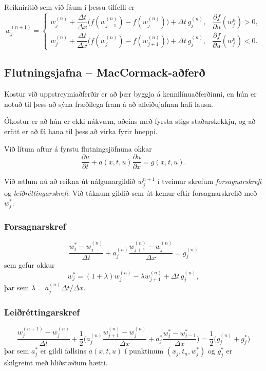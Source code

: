 \documentclass[icelandic,a4paper,12pt]{article}
\begin{document}
Reikniritið sem við fáum í þessu tilfelli er
$$
w_j^{(n+1)}=
\begin{cases} 
w_j^{(n)}+\dfrac{\Delta t}{\Delta x} 
\big(f(w_{j-1}^{(n)})-f(w_j^{(n)})\big)
+\Delta t\, g_j^{(n)},& \dfrac{\partial f}{\partial u}(w_j^{n})>0,\\
w_j^{(n)}+\dfrac{\Delta t}{\Delta x} 
\big(f(w_{j}^{(n)})-f(w_{j+1}^{(n)})\big)
+\Delta t\, g_j^{(n)}, &\dfrac{\partial f}{\partial u}(w_j^{n})<0.
\end{cases}
$$



\subsection{Flutningsjafna -- MacCormack-aðferð} 
Kostur við uppstreymiaðferðir er að þær byggja á kennilínuaðferðinni,
en hún er notuð  til þess að sýna fræðilega fram á að afleiðujafnan
hafi lausn.

\smallskip
Ókostur er að hún er ekki nákvæm, aðeins með fyrsta stigs
staðarskekkju, og að erfitt er að fá hana til þess að virka fyrir
hneppi.

Við lítum aftur á fyrstu flutningsjöfnuna okkar
$$
\dfrac{\partial u}{\partial t}
+a(x,t,u)\dfrac{\partial u}{\partial x}=g(x,t,u).
$$

Við ætlum nú að reikna út nálgunargildið $w_j^{n+1}$ í tveimur skrefum
{\it forsagnarskrefi} og {\it leiðréttingarskrefi}.  Við táknum gildið
sem út kemur eftir forsagnarskrefið með $w_j^*$.



\subsubsection{Forsagnarskref} 
$$
\dfrac{w_j^*-w_j^{(n)}}{\Delta t} 
+a_j^{(n)}\dfrac{w_{j+1}^{(n)}-w_j^{(n)}}{\Delta x}=g_j^{(n)}
$$
sem gefur okkur
$$
w_j^*=(1+\lambda) w_j^{(n)}-\lambda w_{j+1}^{(n)}+\Delta t\, g_j^{(n)},
$$
þar sem $\lambda=a_j^{(n)}\Delta t/\Delta x$.



\subsubsection{Leiðréttingarskref} 
$$
\dfrac{w_j^{(n+1)}-w_j^{(n)}}{\Delta t}
+\dfrac 12\bigg(a_j^{(n)}\dfrac{w_{j+1}^{(n)}-w_j^{(n)}}{\Delta x}
+a_j^*\dfrac{w_j^*-w_{j-1}^*}{\Delta x}\bigg)
=\dfrac  12\big(g_j^{(n)}+g_j^*\big)
$$
þar sem  $a_j^*$ er gildi fallsins $a(x,t,u)$ í punktinum
$(x_j,t_n,w_j^*)$ og $g_j^*$ er skilgreint með hliðstæðum hætti.
\end{document}
